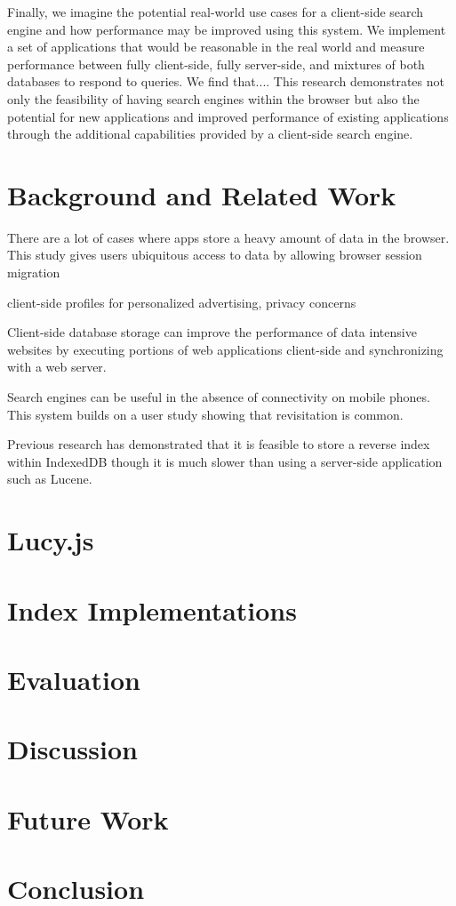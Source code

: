 \documentclass{vldb}
\begin{document}
Finally, we imagine the potential real-world use cases for a client-side search engine and how performance may be improved using this system. We implement a set of applications that would be reasonable in the real world and measure performance between fully client-side, fully server-side, and mixtures of both databases to respond to queries. We find that....
This research demonstrates not only the feasibility of having search engines within the browser but also the potential for new applications and improved performance of existing applications through the additional capabilities provided by a client-side search engine.


\section{Background and Related Work}

There are a lot of cases where apps store a heavy amount of data in the browser. This study gives users ubiquitous access to data by allowing browser session migration \cite{lo2013imagen}

client-side profiles for personalized advertising, privacy concerns \cite{bilenko2011predictive}

Client-side database storage can improve the performance of data intensive websites by executing portions of web applications client-side and synchronizing with a web server.
\cite{benson2010sync}


Search engines can be useful in the absence of connectivity on mobile phones. This system builds on a user study showing that revisitation is common.
\cite{balasubramanian2012findall}

Previous research has demonstrated that it is feasible to store a reverse index within IndexedDB
\cite{lin:jscene} though it is much slower than using a server-side application such as Lucene.




\section{Lucy.js}



\section{Index Implementations}



\section{Evaluation}


\section{Discussion}

\section{Future Work}

\section{Conclusion}



 
\end{document}

